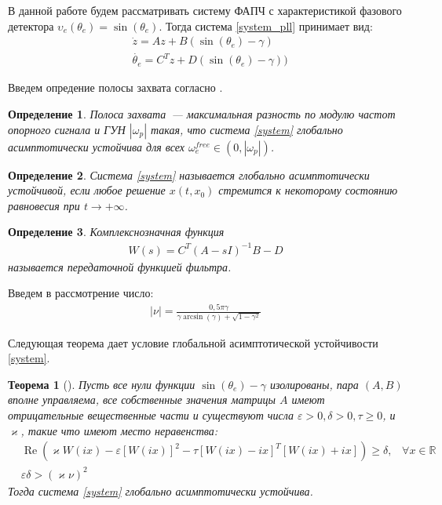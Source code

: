 \documentclass[a4paper,14pt]{article} %
\theoremstyle{cited}
\newtheorem{definition}{Определение}
\newtheorem{theorem}{Теорема}
\begin{document}
В данной работе будем рассматривать систему ФАПЧ с характеристикой фазового детектора $\upsilon_e(\theta_e) = \operatorname{sin}(\theta_e)$. Тогда система \eqref{system_pll} принимает вид:
 \begin{equation}\label{system}
 \begin{aligned}
 &\dot{z} = Az + B(\operatorname{sin}(\theta_e) - \gamma)\\
 &\dot{\theta_e} = C^Tz + D(\operatorname{sin}(\theta_e) - \gamma))
 \end{aligned}
\end{equation}

Введем опредение полосы захвата согласно \cite{kuznetsov_article}.
\begin{definition}
Полоса захвата~--- максимальная разность по модулю частот опорного сигнала и ГУН $|\omega_p|$ такая, что система \eqref{system} глобально асимптотически устойчива для всех $\omega_e^{free} \in (0, |\omega_p|)$.
\end{definition}

\begin{definition}
Система \eqref{system} называется глобально асимптотически устойчивой, если любое решение $x(t, x_0)$  стремится к некоторому состоянию равновесия при $t \rightarrow +\infty$.
\end{definition}

\begin{definition}
Комплекснозначная функция  
\begin{equation}
 \begin{aligned}
 W(s)=C^T \left(A-sI\right)^{-1}B - D
 \end{aligned}
\end{equation}
называется передаточной функцией фильтра.
\end{definition}

Введем в рассмотрение число:
 \begin{equation}
 \begin{aligned}
\mid\nu\mid = \frac{0,5\pi\gamma}{\gamma \operatorname{arcsin} (\gamma) + \sqrt{1-\gamma^2}}
 \end{aligned}
\end{equation}

Следующая теорема дает условие глобальной асимптотической устойчивости \eqref{system}.
\begin{theorem}[\cite{leonov}]\label{th1}
Пусть все нули функции $\operatorname{sin}(\theta_e) - \gamma$ изолированы, пара $(A, B)$ вполне управляема, все собственные значения матрицы $A$ имеют отрицательные вещественные части и существуют числа $\varepsilon > 0, \delta > 0, \tau \geqslant 0$, и $\varkappa$, такие что имеют место неравенства:
 \begin{align}
&\operatorname{Re}\left( \varkappa W(ix)- \varepsilon\left[W(ix)\right]^2-\tau\left[ W(ix)-ix \right]^T\left[W(ix)+ix \right]\right) \geqslant \delta \text{,} \quad
\forall x \in \mathbb{R} \label{first_th_eq}\\
&\varepsilon\delta > (\varkappa\nu)^2\label{second_th_eq}
 \end{align}
 Тогда система \eqref{system} глобально асимптотически устойчива.
\end{theorem}
\end{document}

